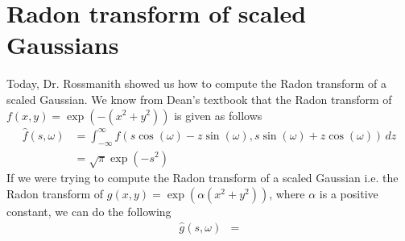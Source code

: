 

\section*{Radon transform of scaled Gaussians}
Today, Dr. Rossmanith showed us how to compute the Radon transform of a scaled Gaussian.
We know from Dean's textbook that the Radon transform of $f(x, y) = \exp (-(x^{2} + y^{2}))$ is given as follows
\begin{align*}
\hat{f} (s, \omega) & = \int_{-\infty}^{\infty} f(s \cos (\omega) - z \sin (\omega), s \sin (\omega) + z \cos (\omega)) \, dz \\
& = \sqrt{\pi} \exp(-s^{2})
\end{align*}
If we were trying to compute the Radon transform of a scaled Gaussian i.e. the Radon transform of $g(x, y) = \exp (\alpha (x^{2} + y^{2}))$, where $\alpha$ is a positive constant, we can do the following
\begin{align*}
\hat{g} (s, \omega) & = 
\end{align*}